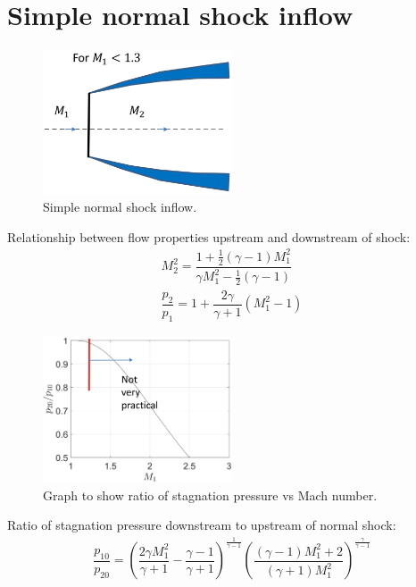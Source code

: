\section{Simple normal shock inflow}
\begin{figure}[H]
    \centering
    \includegraphics[width = 0.5\textwidth]{./img/diagram46.png}
    \caption{Simple normal shock inflow.}
\end{figure}
Relationship between flow properties upstream and downstream of shock:
\begin{gather}
    M^2_2 = \dfrac{1 + \frac{1}{2}\left(\gamma - 1\right)M^2_1}{\gamma M^2_1 - \frac{1}{2}\left(\gamma - 1\right)}\\
    \dfrac{p_2}{p_1} = 1 + \dfrac{2\gamma}{\gamma + 1}\left(M^2_1 - 1\right)
\end{gather}
\begin{figure}[H]
    \centering
    \includegraphics[width = 0.5\textwidth]{./img/diagram47.png}
    \caption{Graph to show ratio of stagnation pressure vs Mach number.}
\end{figure}
Ratio of stagnation pressure downstream to upstream of normal shock:
\begin{gather}
    \dfrac{p_{10}}{p_{20}} = \left(\dfrac{2\gamma M^2_1}{\gamma + 1}- \dfrac{\gamma - 1}{\gamma +1}\right)^{\frac{1}{\gamma - 1}}\left(\dfrac{\left(\gamma -1 \right)M^2_1+2}{\left(\gamma +1\right)M^2_1}\right)^{\frac{\gamma}{\gamma - 1}}
\end{gather}
